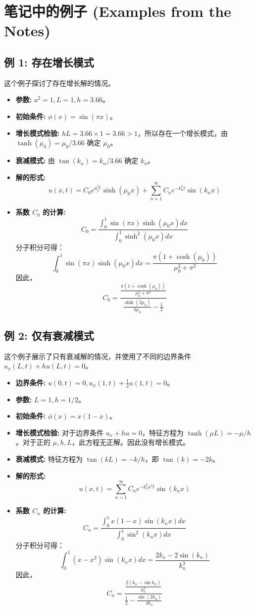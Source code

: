 \documentclass{article}
\begin{document}
	\section{笔记中的例子 (Examples from the Notes)}
	
	\subsection{例 1: 存在增长模式}
	这个例子探讨了存在增长解的情况。
	\begin{itemize}
		\item \textbf{参数:} $a^2=1, L=1, h=3.66$。
		\item \textbf{初始条件:} $\phi(x) = \sin(\pi x)$。
		\item \textbf{增长模式检验:} $hL = 3.66 \times 1 = 3.66 > 1$，所以存在一个增长模式，由 $\tanh(\mu_0) = \mu_0/3.66$ 确定 $\mu_0$。
		\item \textbf{衰减模式:} 由 $\tan(k_n) = k_n/3.66$ 确定 $k_n$。
		\item \textbf{解的形式:}
		$$
		u(x,t) = C_0 e^{\mu_0^2 t} \sinh(\mu_0 x) + \sum_{n=1}^{\infty} C_n e^{-k_n^2 t} \sin(k_n x)
		$$
		\item \textbf{系数 $C_0$ 的计算:}
		$$
		C_0 = \frac{\int_0^1 \sin(\pi x) \sinh(\mu_0 x) dx}{\int_0^1 \sinh^2(\mu_0 x) dx}
		$$
		分子积分可得：
		$$
		\int_0^1 \sin(\pi x) \sinh(\mu_0 x) dx = \frac{\pi (1+\cosh(\mu_0))}{\mu_0^2 + \pi^2}
		$$
		因此，
		$$
		C_0 = \frac{\frac{\pi (1+\cosh(\mu_0))}{\mu_0^2 + \pi^2}}{\frac{\sinh(2\mu_0)}{4\mu_0} - \frac{1}{2}}
		$$
	\end{itemize}
	
	\subsection{例 2: 仅有衰减模式}
	这个例子展示了只有衰减解的情况，并使用了不同的边界条件 $u_x(L,t) + hu(L,t) = 0$。
	\begin{itemize}
		\item \textbf{边界条件:} $u(0,t)=0, u_x(1,t) + \frac{1}{2}u(1,t)=0$。
		\item \textbf{参数:} $L=1, h=1/2$。
		\item \textbf{初始条件:} $\phi(x) = x(1-x)$。
		\item \textbf{增长模式检验:} 对于边界条件 $u_x + hu=0$，特征方程为 $\tanh(\mu L) = -\mu/h$。对于正的 $\mu, h, L$，此方程无正解。因此没有增长模式。
		\item \textbf{衰减模式:} 特征方程为 $\tan(kL) = -k/h$，即 $\tan(k) = -2k$。
		\item \textbf{解的形式:}
		$$
		u(x,t) = \sum_{n=1}^{\infty} C_n e^{-k_n^2 a^2 t} \sin(k_n x)
		$$
		\item \textbf{系数 $C_n$ 的计算:}
		$$
		C_n = \frac{\int_0^1 x(1-x) \sin(k_n x) dx}{\int_0^1 \sin^2(k_n x) dx}
		$$
		分子积分可得：
		$$
		\int_0^1 (x-x^2)\sin(k_n x) dx = \frac{2k_n - 2\sin(k_n)}{k_n^3}
		$$
		因此，
		$$
		C_n = \frac{\frac{2(k_n - \sin k_n)}{k_n^3}}{\frac{1}{2} - \frac{\sin(2k_n)}{4k_n}}
		$$
	\end{itemize}
\end{document}

